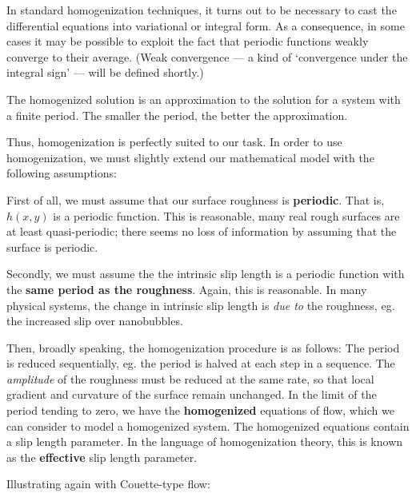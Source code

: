 \documentclass[a4paper]{report}
\begin{document}
In standard homogenization techniques, it turns out to be necessary to cast the differential equations into variational or integral form.  As a consequence, in some cases it may be possible to exploit the fact that periodic functions weakly converge to their average.  (Weak convergence --- a kind of `convergence under the integral sign' --- will be defined shortly.)

The homogenized solution is an approximation to the solution for a system with a finite period.  The smaller the period, the better the approximation.



\vspace{1em}
Thus, homogenization is perfectly suited to our task.  
In order to use homogenization, we must slightly extend our mathematical model with the following assumptions:

\vspace{1em}
First of all, we must assume that our surface roughness is \textbf{periodic}.  That is, $h(x,y)$ is a periodic function.  This is reasonable, many real rough surfaces are at least quasi-periodic; there seems no loss of information by assuming that the surface is periodic.

Secondly, we must assume the the intrinsic slip length is a periodic function with the \textbf{same period as the roughness}.  Again, this is reasonable.   In many physical systems, the change in intrinsic slip length is \emph{due to} the roughness, eg. the increased slip over nanobubbles.

\vspace{1em}
Then, broadly speaking, the homogenization procedure is as follows:
The period is reduced sequentially, eg. the period is halved at each step in a sequence.
The \emph{amplitude} of the roughness must be reduced at the same rate, so that local gradient and curvature of the surface remain unchanged.  In the limit of the period tending to zero, we have the \textbf{homogenized} equations of flow, which we can consider to model a homogenized system.  The homogenized equations contain a slip length parameter.  In the language of homogenization theory, this is known as the \textbf{effective} slip length parameter.

Illustrating again with Couette-type flow:
\end{document}
